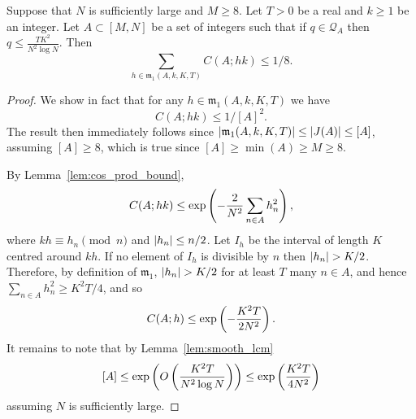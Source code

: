 \begin{lemma}\label{lem:minor1_bound}
  \leanok
Suppose that $N$ is sufficiently large and $M\geq 8$. Let $T>0$ be a real and $k\geq 1$ be an integer. Let $A\subset [M,N]$ be a set of integers such that if $q\in\mathcal{Q}_A$ then $q\leq \frac{TK^2}{N^2 \log N}$. Then
\[\sum_{h\in \mathfrak{m}_1(A,k,K,T)} C(A;hk)\leq 1/8.\]
\end{lemma}
\begin{proof}
  \leanok
{}
We show in fact that for any $h\in \mathfrak{m}_1(A,k,K,T)$ we have
\[C(A;hk)\leq 1/[A]^2.\]
The result then immediately follows since $\left\lvert \mathfrak{m}_1(A,k,K,T)\right\rvert\leq \left\lvert J(A)\right\rvert\leq [A]$, assuming $[A]\geq 8$, which is true since $[A]\geq \min(A)\geq M\geq 8$.

By Lemma~\ref{lem:cos_prod_bound},
\[C(A;hk)\leq \exp\left( -\frac{2}{N^2}\sum_{n\in A}h_n^2\right),\]
where $kh\equiv h_n\pmod{n}$ and $\left\lvert h_n\right\rvert\leq n/2$. Let $I_h$ be the interval of length $K$ centred around $kh$. If no element of $I_h$ is divisible by $n$ then $\left\lvert h_n\right\rvert>K/2$. Therefore, by definition of $\mathfrak{m}_1$, $\left\lvert h_n\right\rvert>K/2$ for at least $T$ many $n\in A$, and hence $\sum_{n\in A}h_n^2\geq K^2T/4$, and so
\[C(A;h)\leq \exp\left( -\frac{K^2T}{2N^2}\right).\]
It remains to note that by Lemma~\ref{lem:smooth_lcm}
\[[A]\leq \exp\left( O\left( \frac{K^2T}{N^2\log N}\right)\right)\leq \exp\left( \frac{K^2T}{4N^2}\right)\]
assuming $N$ is sufficiently large.
\end{proof}

